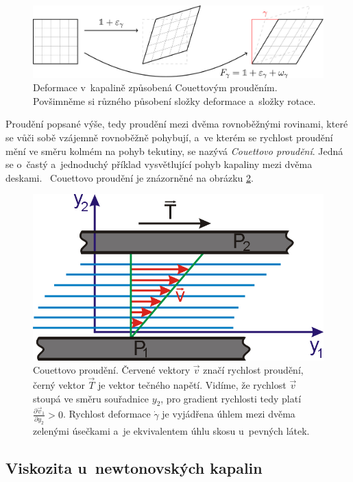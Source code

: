 \documentclass[12pt]{article}
\begin{document}
\begin{figure}
    \centering
    \includegraphics{figures/deformace_couett.jpg}
    \caption{Deformace v~kapalině způsobená Couettovým prouděním. Povšimněme si různého působení složky deformace a~složky rotace.~\cite{Figure:Deformace_couett}}
    \label{fig:Deformace_couett}
\end{figure}

Proudění popsané výše, tedy proudění mezi dvěma rovnoběžnými rovinami, které se vůči sobě vzájemně rovnoběžně pohybují, a~ve kterém se rychlost proudění mění ve směru kolmém na pohyb tekutiny, se nazývá \emph{Couettovo proudění}. Jedná se o~častý a~jednoduchý příklad vysvětlující pohyb kapaliny mezi dvěma deskami.~\cite{online:Skripta_rychlost_deformace} Couettovo proudění je znázorněné na obrázku \ref{fig:couett}.

\begin{figure}
    \centering
    \includegraphics[width = 0.5\linewidth]{figures/couette.jpg}
    \caption{Couettovo proudění. Červené vektory $\vec{v}$ značí rychlost proudění, černý vektor $\vec{T}$ je vektor tečného napětí. Vidíme, že rychlost $\vec{v}$ stoupá ve směru souřadnice $y_2$, pro gradient rychlosti tedy platí $\frac{\partial\vec{v}_1}{\partial y_2} > 0$. Rychlost deformace $\dot\gamma$ je vyjádřena úhlem mezi dvěma zelenými úsečkami a~je ekvivalentem úhlu skosu u~pevných látek.~\cite{Figure:Skripta_couette}}
    \label{fig:couett}
\end{figure}

\subsection{Viskozita u~newtonovských kapalin}%
\end{document}
